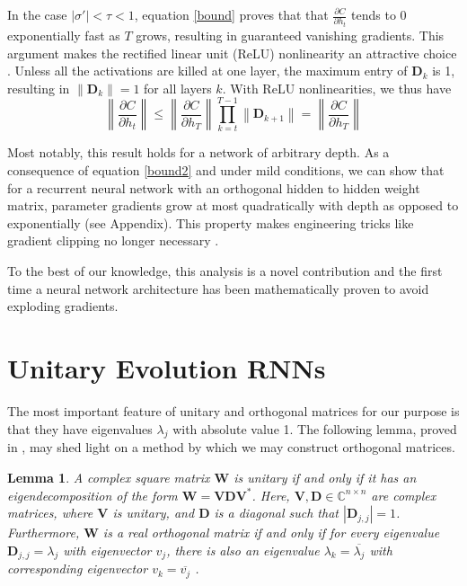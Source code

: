 \documentclass{article} %
\newcommand{\matr}[1]{\mathbf{#1}}
\newtheorem{lemma}{Lemma}
\newcommand\norm[1]{\left\lVert#1\right\rVert}
\begin{document}
In the case $|\sigma'| < \tau < 1$, equation \ref{bound} proves that 
that $\frac{\partial C}{\partial h_t}$ tends to 0 exponentially fast as $T$ grows, 
resulting in guaranteed vanishing gradients. 
This argument makes the rectified linear unit (ReLU) nonlinearity an attractive choice
\citep{Glorot2011, Nair2010}. Unless all the activations are killed at one layer, 
the maximum entry of $\matr{D}_k$ is 1, resulting in
$\norm{\matr{D}_k} = 1$ for all layers $k$. With ReLU nonlinearities, we thus have
\begin{equation}
  \norm{\frac{\partial C}{\partial h_t}} \leq \norm{ \frac{\partial C}{\partial h_T}} 
  \prod_{k=t}^{T-1} \norm{\matr{D}_{k+1}} = \norm{\frac{\partial C}{\partial h_T}}
\label{bound2}
\end{equation}

Most notably, this result holds for a network of arbitrary depth. 
As a consequence of equation \ref{bound2} and under mild conditions, we can show that
for a recurrent neural network with an orthogonal hidden to hidden weight matrix, 
parameter gradients grow at most quadratically with depth as opposed to exponentially
{\color{red}(see Appendix)}. This property makes engineering tricks like gradient clipping no longer
necessary \citep{Pascanu2013}.

To the best of our knowledge, this analysis is a novel contribution and the first time a 
neural network architecture has been mathematically proven to avoid exploding gradients. 


%
%
%
%
%

\section{Unitary Evolution RNNs}
\label{sec:uRNN}

The most important feature of unitary and orthogonal matrices for our purpose is that they have eigenvalues
$\lambda_j$ with absolute value 1. The following lemma, proved in \cite{linalgbook}, may shed light on a 
method by which we may construct orthogonal matrices.

\begin{lemma}
  A complex square matrix $\matr{W}$ is unitary if and only if it has an eigendecomposition of the form
  $\matr{W} = \matr{V} \matr{D} \matr{V}^*$. Here, $\matr{V}, \matr{D} \in \mathbb{C}^{n \times n}$ are
  complex matrices, where $\matr{V}$ is unitary, and $\matr{D}$ is a diagonal such that $|\matr{D}_{j,j}|=1$. 
  Furthermore, $\matr{W}$ is a real orthogonal matrix if and only if for every eigenvalue $\matr{D}_{j,j} 
  = \lambda_j$ with eigenvector $v_j$, there is also an eigenvalue $\lambda_k = \overline{\lambda_j}$ with 
  corresponding eigenvector $v_k = \overline{v_j}$ .
\label{lemma}
\end{lemma}
\end{document}
